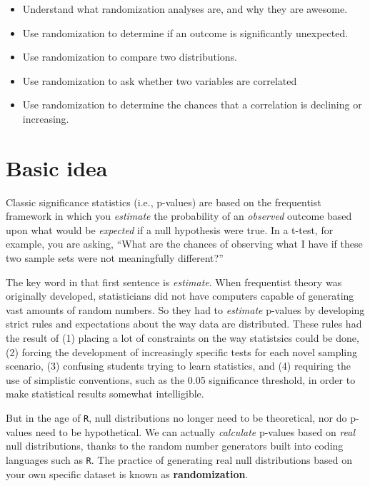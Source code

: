 \documentclass[
]{book}
\providecommand{\tightlist}{%
  \setlength{\itemsep}{0pt}\setlength{\parskip}{0pt}}
\begin{document}
\begin{itemize}
\tightlist
\item
  Understand what randomization analyses are, and why they are awesome.
\item
  Use randomization to determine if an outcome is significantly unexpected.
\item
  Use randomization to compare two distributions.
\item
  Use randomization to ask whether two variables are correlated
\item
  Use randomization to determine the chances that a correlation is declining or increasing.
\end{itemize}

\hypertarget{basic-idea}{%
\section*{Basic idea}\label{basic-idea}}

Classic significance statistics (i.e., p-values) are based on the frequentist framework in which you \emph{estimate} the probability of an \emph{observed} outcome based upon what would be \emph{expected} if a null hypothesis were true. In a t-test, for example, you are asking, ``What are the chances of observing what I have if these two sample sets were not meaningfully different?''

The key word in that first sentence is \emph{estimate}. When frequentist theory was originally developed, statisticians did not have computers capable of generating vast amounts of random numbers. So they had to \emph{estimate} p-values by developing strict rules and expectations about the way data are distributed. These rules had the result of (1) placing a lot of constraints on the way statistsics could be done, (2) forcing the development of increasingly specific tests for each novel sampling scenario, (3) confusing students trying to learn statistics, and (4) requiring the use of simplistic conventions, such as the 0.05 significance threshold, in order to make statistical results somewhat intelligible.

But in the age of \texttt{R}, null distributions no longer need to be theoretical, nor do p-values need to be hypothetical. We can actually \emph{calculate} p-values based on \emph{real} null distributions, thanks to the random number generators built into coding languages such as \texttt{R}. The practice of generating real null distributions based on your own specific dataset is known as \textbf{randomization}.
\end{document}
